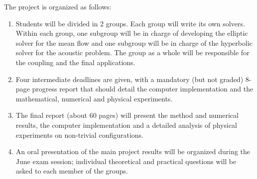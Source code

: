 \documentclass[a4paper,12pt]{article}
\begin{document}
The project is organized as follows:
\begin{enumerate}
\item Students will be divided in 2 groups. Each group will write its own
  solvers. Within each group, one subgroup will be in charge of developing the
  elliptic solver for the mean flow and one subgroup will be in charge of the hyperbolic solver for the acoustic problem. The group as a whole will be responsible for the coupling and the final applications.
\item Four intermediate deadlines are given, with a mandatory (but not graded)
  8-page progress report that should detail the computer implementation and the
  mathematical, numerical and physical experiments.
\item The final report (about 60 pages) will present the method and numerical
  results, the computer implementation and a detailed analysis of physical
  experiments on non-trivial configurations.
\item An oral presentation of the main project results will be organized during
  the June exam session; individual theoretical and practical questions will be
  asked to each member of the groups.
\end{enumerate}
\end{document}
